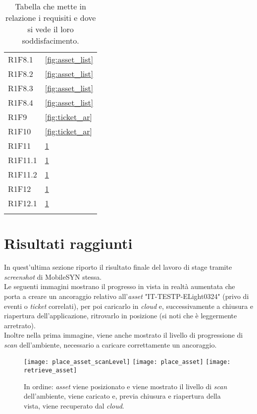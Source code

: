 {\begin{longtable}{C{.3\freewidth} C{.4\freewidth}}
    R1F8.1 & \ref{fig:asset_list}\\
    R1F8.2 & \ref{fig:asset_list}\\
    R1F8.3 &\ref{fig:asset_list}\\
    R1F8.4 & \ref{fig:asset_list}\\
    R1F9 & \ref{fig:ticket_ar}\\
    R1F10 &\ref{fig:ticket_ar}\\ 
    R1F11 &\ref{fig:place_asset} \\
    R1F11.1 & \ref{fig:place_asset}\\
    R1F11.2 & \ref{fig:place_asset}\\
    R1F12 & \ref{fig:place_asset}\\
    R1F12.1 & \ref{fig:place_asset}\\
    
    \bottomrule
    \caption[Tabella requisiti - chi li soddisfa]{Tabella che mette in relazione i requisiti e dove si vede il loro soddisfacimento.}
    \end{longtable}
}

\section{Risultati raggiunti}
In quest'ultima sezione riporto il risultato finale del lavoro di stage tramite \textit{screenshot} di MobileSYN stessa.\\
Le seguenti immagini mostrano il progresso in vista in realtà aumentata che porta a creare un ancoraggio relativo all'\textit{asset} "IT-TESTP-ELight0324" (privo di eventi o \textit{ticket} correlati), per poi caricarlo in \textit{cloud} e, successivamente a chiusura e riapertura dell'applicazione, ritrovarlo in posizione (si noti che è leggermente arretrato).\\
Inoltre nella prima immagine, viene anche mostrato il livello di progressione di \textit{scan} dell'ambiente, necessario a caricare correttamente un ancoraggio.

\begin{figure}[h]
  \centering
  \texttt{[image: place\_asset\_scanLevel]}\hfill
  \texttt{[image: place\_asset]}\hfill
  \texttt{[image: retrieve\_asset]}\hfill

  \caption[Creazione, caricamento e recupero di \textit{asset}]{In ordine: \textit{asset} viene posizionato e viene mostrato il livello di \textit{scan} dell'ambiente, viene caricato e, previa chiusura e riapertura della vista, viene recuperato dal \textit{cloud}.}
  \label{fig:place_asset}
\end{figure}

